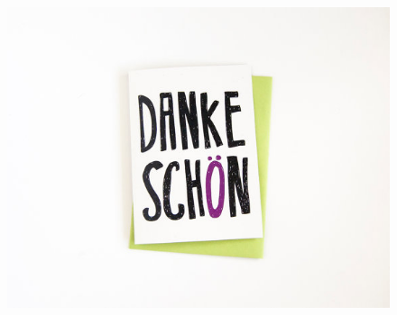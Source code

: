 \documentclass{beamer}
\begin{document}
\begin{frame}
\begin{figure}[!h]
	\centering	
		\includegraphics[width=\textwidth]{images/danke.jpg}
	\end{figure}
\end{frame}

\end{document}
